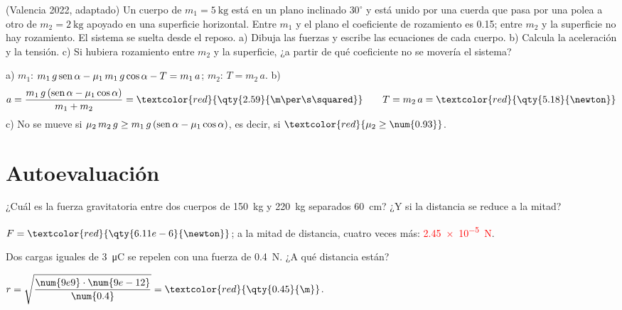 \begin{exercise}
    (Valencia 2022, adaptado) Un cuerpo de \(m_1 = \qty{5}{\kg}\) está en un plano inclinado \(30^\circ\) y está unido por una cuerda que
    pasa por una polea a otro de \(m_2 = \qty{2}{\kg}\) apoyado en una superficie horizontal. Entre \(m_1\) y el plano el coeficiente de
    rozamiento es \num{0.15}; entre \(m_2\) y la superficie no hay rozamiento. El sistema se suelta desde el reposo. a) Dibuja las
    fuerzas y escribe las ecuaciones de cada cuerpo. b) Calcula la aceleración y la tensión. c) Si hubiera rozamiento entre \(m_2\) y la
    superficie, ¿a partir de qué coeficiente no se movería el sistema?
    \begin{solu}
        a) \(m_1\): \(m_1\,g\operatorname{sen}\alpha - \mu_1\,m_1\,g\cos\alpha - T = m_1\,a\); \(m_2\): \(T = m_2\,a\).
        b) \[ a = \frac{m_1\,g\,(\sen\alpha - \mu_1\cos\alpha)}{m_1 + m_2} = \textcolor{red}{\qty{2.59}{\m\per\s\squared}} \qquad
        T = m_2\,a = \textcolor{red}{\qty{5.18}{\newton}} \] c) No se mueve si \(\mu_2\,m_2\,g \geq m_1\,g\,(\operatorname{sen}\alpha - \mu_1\cos\alpha)\), es
        decir, si \(\textcolor{red}{\mu_2 \geq \num{0.93}}\).
    \end{solu}
\end{exercise}

\section{Autoevaluación}\label{sec:ud11-autoevaluacion}

\begin{exercise}
    ¿Cuál es la fuerza gravitatoria entre dos cuerpos de \qty{150}{\kg} y \qty{220}{\kg} separados \qty{60}{\cm}? ¿Y si la distancia se
    reduce a la mitad?
    \begin{solu}
        \(F = \textcolor{red}{\qty{6.11e-6}{\newton}}\); a la mitad de distancia, cuatro veces más: \textcolor{red}{\qty{2.45e-5}{\newton}}.
    \end{solu}
\end{exercise}

\begin{exercise}
    Dos cargas iguales de \qty{3}{\micro\coulomb} se repelen con una fuerza de \qty{0.4}{\newton}. ¿A qué distancia están?
    \begin{solu}
        \(r = \sqrt{\dfrac{\num{9e9} \cdot \num{9e-12}}{\num{0.4}}} = \textcolor{red}{\qty{0.45}{\m}}\).
    \end{solu}
\end{exercise}

